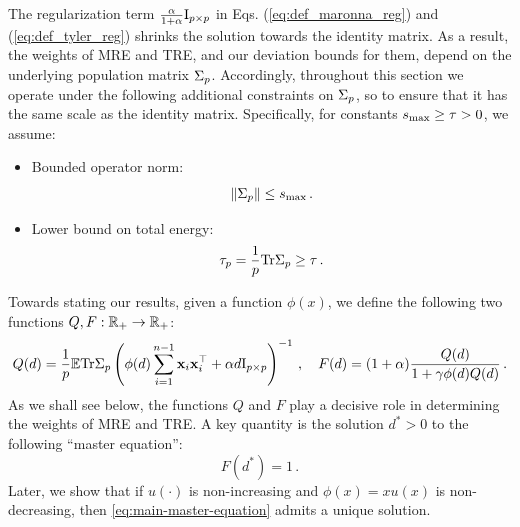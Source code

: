 \documentclass[times,sort&compress,3p]{elsarticle}
\begin{document}
The regularization term $\frac{\alpha}{1+\alpha}\mathrm{I}_{p \times p}$ in Eqs. (\ref{eq:def_maronna_reg}) and (\ref{eq:def_tyler_reg}) shrinks the solution towards the identity matrix. %
As a result, the weights of MRE and TRE, and our deviation bounds 
for them, 
depend on the underlying population  matrix $\Sigma_p$.
Accordingly, 
throughout this section we operate under the following additional constraints on $\Sigma_p$, so to ensure that it has the same scale as the identity matrix. Specifically,
for constants $s_{\max}\ge \tau > 0$, we assume:
\begin{itemize}
    \item Bounded operator norm:
    \begin{equation}\label{eq:cond-smax}
        \|\Sigma_p\| \le s_{\max} \,.
    \end{equation}
    \item Lower bound on total energy:
    \begin{equation}\label{eq:cond-trLB}
        \tau_p = \frac{1}{p}\textrm{Tr}\Sigma_p \ge \tau \,.
    \end{equation}
\end{itemize}

Towards stating our results, 
given a function $\phi(x)$, we 
define the following two functions ${Q,F:\mathbb{R}_{+} \to \mathbb{R}_+}$:
\begin{equation}
    Q(d)=\frac1p {\mathbb{E}} \textrm{Tr} \Sigma_p\left( \phi(d)\sum_{i=1}^{n-1}{\bf x}_i{\bf x}_i^\top + \alpha d \mathrm{I}_{p \times p}\right)^{-1} \,,\quad
    F(d) = (1+\alpha)\frac{Q(d)}{1+\gamma \phi(d) Q(d)}\,.
\end{equation} 
As we shall see below, the functions $Q$ and $F$ play a decisive role in determining the weights of MRE and TRE. A key quantity is the solution $d^*>0$ to the following ``master equation'':
\begin{equation}\label{eq:main-master-equation}
    F(d^*)=1 \,.
\end{equation}
Later, we show that 
if $u(\cdot)$ is non-increasing and
$\phi(x)=xu(x)$ is non-decreasing, 
then \eqref{eq:main-master-equation}
admits a unique solution. 
\end{document}
